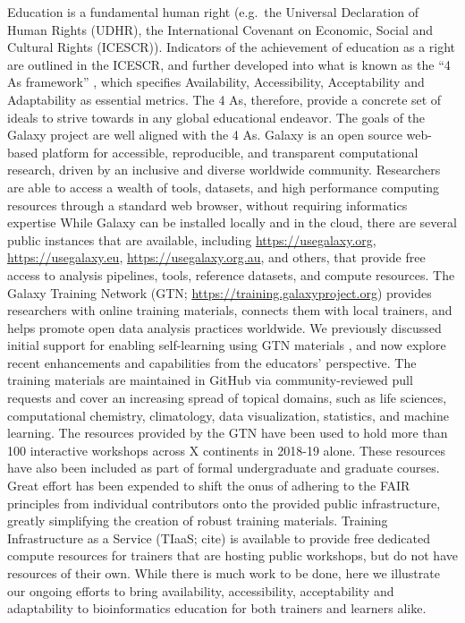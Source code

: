 \documentclass[10pt,letterpaper]{article}
\begin{document}
Education is a fundamental human right (e.g.\ the Universal Declaration of Human Rights (UDHR), the International Covenant on Economic, Social and Cultural Rights (ICESCR)).
Indicators of the achievement of education as a right are outlined in the ICESCR, and further developed into what is known as the “4 As framework” \cite{tomavsevski2001human}, which specifies Availability, Accessibility, Acceptability and Adaptability as essential metrics.
The 4 As, therefore, provide a concrete set of ideals to strive towards in any global educational endeavor.
The goals of the Galaxy project are well aligned with the 4 As.
Galaxy \cite{Afgan2018} is an open source web-based platform for accessible, reproducible, and transparent computational research, driven by an inclusive and diverse worldwide community.
Researchers are able to access a wealth of tools, datasets, and high performance computing resources through a standard web browser, without requiring informatics expertise
While Galaxy can be installed locally and in the cloud, there are several public instances that are available, including \url{https://usegalaxy.org}, \url{https://usegalaxy.eu}, \url{https://usegalaxy.org.au}, and others, that provide free access to analysis pipelines, tools, reference datasets, and compute resources.
The Galaxy Training Network (GTN; \url{https://training.galaxyproject.org}) provides researchers with online training materials, connects them with local trainers, and helps promote open data analysis practices worldwide. We previously discussed initial support for enabling self-learning using GTN materials \cite{Batut2018}, and now explore recent enhancements and capabilities from the educators’ perspective.
The training materials are maintained in GitHub via community-reviewed pull requests and cover an increasing spread of topical domains, such as life sciences, computational chemistry, climatology, data visualization, statistics, and machine learning.
The resources provided by the GTN have been used to hold more than 100 interactive workshops across X continents in 2018-19 alone.
These resources have also been included as part of formal undergraduate and graduate courses. Great effort has been expended to shift the onus of adhering to the FAIR principles \cite{Wilkinson2016} from individual contributors onto the provided public infrastructure, greatly simplifying the creation of robust training materials.
Training Infrastructure as a Service (TIaaS; cite) is available to provide free dedicated compute resources for trainers that are hosting public workshops, but do not have resources of their own.
While there is much work to be done, here we illustrate our ongoing efforts to bring availability, accessibility, acceptability and adaptability to bioinformatics education for both trainers and learners alike.
\end{document}
